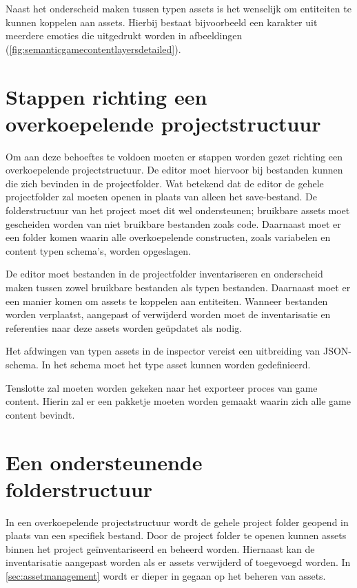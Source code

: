 Naast het onderscheid maken tussen typen assets is het wenselijk om entiteiten te kunnen koppelen aan assets. Hierbij bestaat bijvoorbeeld een karakter uit meerdere emoties die uitgedrukt worden in afbeeldingen (\autoref{fig:semanticgamecontentlayersdetailed}).

\section{Stappen richting een overkoepelende projectstructuur}
Om aan deze behoeftes te voldoen moeten er stappen worden gezet richting een overkoepelende projectstructuur. De editor moet hiervoor bij bestanden kunnen die zich bevinden in de projectfolder. Wat betekend dat de editor de gehele projectfolder zal moeten openen in plaats van alleen het save-bestand. De folderstructuur van het project moet dit wel ondersteunen; bruikbare assets moet gescheiden worden van niet bruikbare bestanden zoals code. Daarnaast moet er een folder komen waarin alle overkoepelende constructen, zoals variabelen en content typen schema's, worden opgeslagen.

De editor moet bestanden in de projectfolder inventariseren en onderscheid maken tussen zowel bruikbare bestanden als typen bestanden. Daarnaast moet er een manier komen om assets te koppelen aan entiteiten. Wanneer bestanden worden verplaatst, aangepast of verwijderd worden moet de inventarisatie en referenties naar deze assets worden geüpdatet als nodig.

Het afdwingen van typen assets in de inspector vereist een uitbreiding van JSON-schema. In het schema moet het type asset kunnen worden gedefinieerd.

Tenslotte zal moeten worden gekeken naar het exporteer proces van game content. Hierin zal er een pakketje moeten worden gemaakt waarin zich alle game content bevindt.

\section{Een ondersteunende folderstructuur}
In een overkoepelende projectstructuur wordt de gehele project folder geopend in plaats van een specifiek bestand. Door de project folder te openen kunnen assets binnen het project geïnventariseerd en beheerd worden. Hiernaast kan de inventarisatie aangepast worden als er assets verwijderd of toegevoegd worden. In \autoref{sec:assetmanagement} wordt er dieper in gegaan op het beheren van assets.

